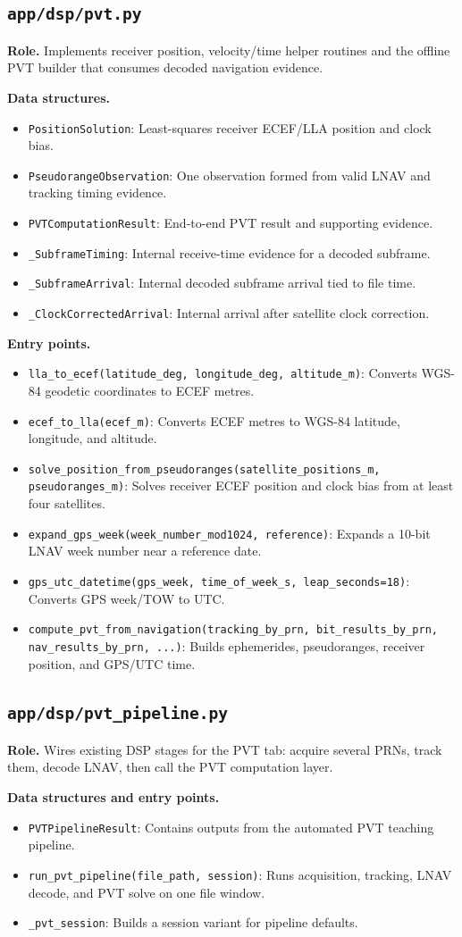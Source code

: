 \documentclass[11pt,a4paper]{article}
\newcommand{\codepath}[1]{\nolinkurl{#1}}
\newcommand{\codeheading}[1]{\texorpdfstring{\codepath{#1}}{#1}}
\newcommand{\codesym}[1]{\nolinkurl{#1}}
\newcommand{\apiitem}[2]{\item \codesym{#1}: #2}
\begin{document}
\subsection{\codeheading{app/dsp/pvt.py}}

\textbf{Role.} Implements receiver position, velocity/time helper routines and the offline PVT builder that consumes decoded navigation evidence.

\textbf{Data structures.}
\begin{itemize}
  \apiitem{PositionSolution}{Least-squares receiver ECEF/LLA position and clock bias.}
  \apiitem{PseudorangeObservation}{One observation formed from valid LNAV and tracking timing evidence.}
  \apiitem{PVTComputationResult}{End-to-end PVT result and supporting evidence.}
  \apiitem{\_SubframeTiming}{Internal receive-time evidence for a decoded subframe.}
  \apiitem{\_SubframeArrival}{Internal decoded subframe arrival tied to file time.}
  \apiitem{\_ClockCorrectedArrival}{Internal arrival after satellite clock correction.}
\end{itemize}

\textbf{Entry points.}
\begin{itemize}
  \apiitem{lla_to_ecef(latitude_deg, longitude_deg, altitude_m)}{Converts WGS-84 geodetic coordinates to ECEF metres.}
  \apiitem{ecef_to_lla(ecef_m)}{Converts ECEF metres to WGS-84 latitude, longitude, and altitude.}
  \apiitem{solve_position_from_pseudoranges(satellite_positions_m, pseudoranges_m)}{Solves receiver ECEF position and clock bias from at least four satellites.}
  \apiitem{expand_gps_week(week_number_mod1024, reference)}{Expands a 10-bit LNAV week number near a reference date.}
  \apiitem{gps_utc_datetime(gps_week, time_of_week_s, leap_seconds=18)}{Converts GPS week/TOW to UTC.}
  \apiitem{compute_pvt_from_navigation(tracking_by_prn, bit_results_by_prn, nav_results_by_prn, ...)}{Builds ephemerides, pseudoranges, receiver position, and GPS/UTC time.}
\end{itemize}

\subsection{\codeheading{app/dsp/pvt_pipeline.py}}

\textbf{Role.} Wires existing DSP stages for the PVT tab: acquire several PRNs, track them, decode LNAV, then call the PVT computation layer.

\textbf{Data structures and entry points.}
\begin{itemize}
  \apiitem{PVTPipelineResult}{Contains outputs from the automated PVT teaching pipeline.}
  \apiitem{run_pvt_pipeline(file_path, session)}{Runs acquisition, tracking, LNAV decode, and PVT solve on one file window.}
  \apiitem{\_pvt_session}{Builds a session variant for pipeline defaults.}
\end{itemize}
\end{document}
